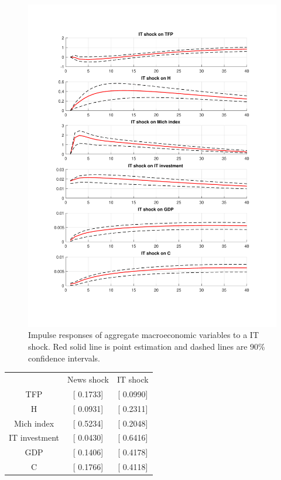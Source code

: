 \documentclass{article}
\begin{document}
\begin{figure}
	\centering
	\includegraphics[scale=0.5]{figure(2)_IT}
	\caption{Impulse responses of aggregate macroeconomic variables to a IT shock. Red solid line is point estimation and dashed lines are 90\% confidence intervals.}
\end{figure}

\begin{table}[h!]
	\centering
	\begin{tabular}{ c c c }
		&       News shock     &      IT shock \\
		TFP              &       [    0.1733]   &      [  0.0990] \\
		H                &       [    0.0931]   &      [  0.2311] \\
		Mich index       &       [    0.5234]   &      [  0.2048] \\
		IT investment    &       [    0.0430]   &      [  0.6416] \\
		GDP              &       [    0.1406]   &      [  0.4178] \\
		C                &       [    0.1766]   &      [  0.4118] \\
	\end{tabular}
\end{table}
\end{document}
